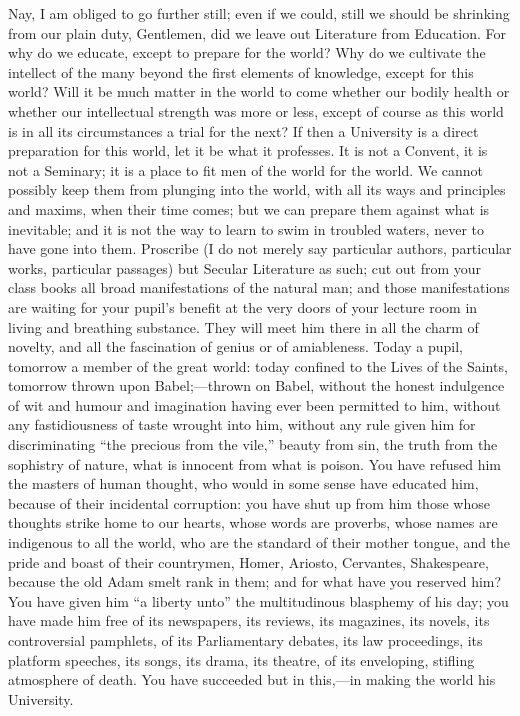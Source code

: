 Nay, I am obliged to go further still; even if we could, still we
should be shrinking from our plain duty, Gentlemen, did we leave out
Literature from Education. For why do we educate, except to prepare
for the world? Why do we cultivate the intellect of the many beyond
the first elements of knowledge, except for this world? Will it be
much matter in the world to come whether our bodily health or whether
our intellectual strength was more or less, except of course as this
world is in all its circumstances a trial for the next? If then a
University is a direct preparation for this world, let it be what it
professes. It is not a Convent, it is not a Seminary; it is a place to
fit men of the world for the world. We cannot possibly keep them from
plunging into the world, with all its ways and principles and maxims,
when their time comes; but we can prepare them against what is
inevitable; and it is not the way to learn to swim in troubled waters,
never to have gone into them. Proscribe (I do not merely say
particular authors, particular works, particular passages) but Secular
Literature as such; cut out from your class books all broad
manifestations of the natural man; and those manifestations are
waiting for your pupil's benefit at the very doors of your lecture
room in living and breathing substance. They will meet him there
in all the charm of novelty, and all the fascination of genius or of
amiableness. Today a pupil, tomorrow a member of the great world:
today confined to the Lives of the Saints, tomorrow thrown upon Babel;—thrown
on Babel, without the honest indulgence of wit and humour and
imagination having ever been permitted to him, without any
fastidiousness of taste wrought into him, without any rule given him
for discriminating ``the precious from the vile,'' beauty from
sin, the truth from the sophistry of nature, what is innocent from
what is poison. You have refused him the masters of human thought, who
would in some sense have educated him, because of their incidental
corruption: you have shut up from him those whose thoughts strike home
to our hearts, whose words are proverbs, whose names are indigenous to
all the world, who are the standard of their mother tongue, and the
pride and boast of their countrymen, Homer, Ariosto, Cervantes,
Shakespeare, because the old Adam smelt rank in them; and for what
have you reserved him? You have given him ``a liberty unto''
the multitudinous blasphemy of his day; you have made him free of its
newspapers, its reviews, its magazines, its novels, its controversial
pamphlets, of its Parliamentary debates, its law proceedings, its
platform speeches, its songs, its drama, its theatre, of its
enveloping, stifling atmosphere of death. You have succeeded but in
this,—in making the world his University.

